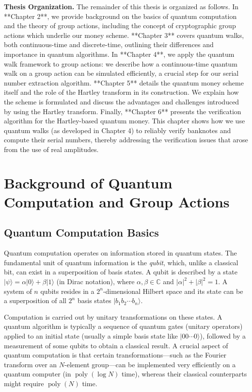 \documentclass[12pt]{report}
\begin{document}
\medskip\noindent\textbf{Thesis Organization.} 
The remainder of this thesis is organized as follows. In **Chapter 2**, we provide background on the basics of quantum computation and the theory of group actions, including the concept of cryptographic group actions which underlie our money scheme. **Chapter 3** covers quantum walks, both continuous-time and discrete-time, outlining their differences and importance in quantum algorithms. In **Chapter 4**, we apply the quantum walk framework to group actions: we describe how a continuous-time quantum walk on a group action can be simulated efficiently, a crucial step for our serial number extraction algorithm. **Chapter 5** details the quantum money scheme itself and the role of the Hartley transform in its construction. We explain how the scheme is formulated and discuss the advantages and challenges introduced by using the Hartley transform. Finally, **Chapter 6** presents the verification algorithm for the Hartley-based quantum money. This chapter shows how we use quantum walks (as developed in Chapter 4) to reliably verify banknotes and compute their serial numbers, thereby addressing the verification issues that arose from the use of real amplitudes.
\vspace{1em}



\chapter{Background of Quantum Computation and Group Actions}



\section{Quantum Computation Basics}

Quantum computation operates on information stored in quantum states. The fundamental unit of quantum information is the \emph{qubit}, which, unlike a classical bit, can exist in a superposition of basis states. A qubit is described by a state $|\psi\rangle = \alpha |0\rangle + \beta |1\rangle$ (in Dirac notation), where $\alpha,\beta \in \mathbb{C}$ and $|\alpha|^2 + |\beta|^2 = 1$. A system of $n$ qubits resides in a $2^n$-dimensional Hilbert space and its state can be a superposition of all $2^n$ basis states $|b_1b_2\cdots b_n\rangle$. 

Computation is carried out by unitary transformations on these states. A quantum algorithm is typically a sequence of quantum gates (unitary operators) applied to an initial state (usually a simple basis state like $|00\cdots0\rangle$), followed by a measurement of some qubits to obtain a classical result. A crucial aspect of quantum computation is that certain transformations—such as the Fourier transform over an $N$-element group—can be implemented very efficiently on a quantum computer (in $\operatorname{poly}(\log N)$ time), whereas their classical counterparts might require $\operatorname{poly}(N)$ time.
\end{document}
